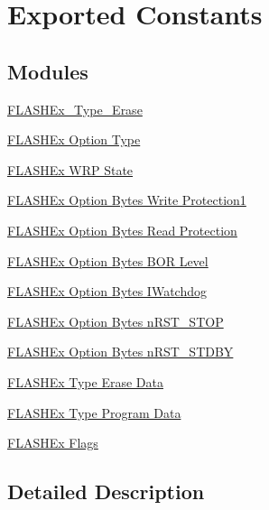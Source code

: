 \hypertarget{group___f_l_a_s_h_ex___exported___constants}{\section{Exported Constants}
\label{group___f_l_a_s_h_ex___exported___constants}
}
\subsection*{Modules}
\begin{DoxyCompactItemize}
\item 
\hyperlink{group___f_l_a_s_h_ex___type___erase}{F\-L\-A\-S\-H\-Ex\-\_\-\-Type\-\_\-\-Erase}
\item 
\hyperlink{group___f_l_a_s_h_ex___option___type}{F\-L\-A\-S\-H\-Ex Option Type}
\item 
\hyperlink{group___f_l_a_s_h_ex___w_r_p___state}{F\-L\-A\-S\-H\-Ex W\-R\-P State}
\item 
\hyperlink{group___f_l_a_s_h_ex___option___bytes___write___protection1}{F\-L\-A\-S\-H\-Ex Option Bytes Write Protection1}
\item 
\hyperlink{group___f_l_a_s_h_ex___option___bytes___read___protection}{F\-L\-A\-S\-H\-Ex Option Bytes Read Protection}
\item 
\hyperlink{group___f_l_a_s_h_ex___option___bytes___b_o_r___level}{F\-L\-A\-S\-H\-Ex Option Bytes B\-O\-R Level}
\item 
\hyperlink{group___f_l_a_s_h_ex___option___bytes___i_watchdog}{F\-L\-A\-S\-H\-Ex Option Bytes I\-Watchdog}
\item 
\hyperlink{group___f_l_a_s_h_ex___option___bytes__n_r_s_t___s_t_o_p}{F\-L\-A\-S\-H\-Ex Option Bytes n\-R\-S\-T\-\_\-\-S\-T\-O\-P}
\item 
\hyperlink{group___f_l_a_s_h_ex___option___bytes__n_r_s_t___s_t_d_b_y}{F\-L\-A\-S\-H\-Ex Option Bytes n\-R\-S\-T\-\_\-\-S\-T\-D\-B\-Y}
\item 
\hyperlink{group___f_l_a_s_h_ex___type___erase___data}{F\-L\-A\-S\-H\-Ex Type Erase Data}
\item 
\hyperlink{group___f_l_a_s_h_ex___type___program___data}{F\-L\-A\-S\-H\-Ex Type Program Data}
\item 
\hyperlink{group___f_l_a_s_h_ex___flags}{F\-L\-A\-S\-H\-Ex Flags}
\end{DoxyCompactItemize}


\subsection{Detailed Description}
